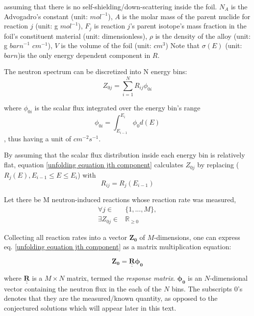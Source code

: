 \documentclass[a4paper, 12pt]{article}
\newcommand{\matr}[1]{\underline{\underline{\textbf{#1}}}}
\newcommand{\ve}[1]{\boldsymbol{#1}}
\begin{document}
assuming that there is no self-shielding/down-scattering inside the foil.
$N_A$ is the Advogadro's constant (unit: ${mol}^{-1}$),
$A$ is the molar mass of the parent nuclide for reaction $j$ (unit: g ${mol}^{-1}$),
$F_j$ is reaction $j$'s parent isotope's mass fraction in the foil's constituent material (unit: dimensionless),
$\rho$ is the density of the alloy (unit: g ${barn}^{-1}$ ${cm}^{-1}$),
$V$ is the volume of the foil (unit: ${cm}^3$) Note that $\sigma(E)$ (unit: $barn$)is the only energy dependent component in $R$. %

The neutron spectrum can be discretized into N energy bins:
\begin{equation} \label{unfolding equation jth component}
    Z_{0j}= \sum_{i=1}^{N} R_{ij} \phi_{0i}
\end{equation}

where $\phi_{0i}$ is the scalar flux integrated over the energy bin's range 
\begin{equation}
    \phi_{0i} = \int_{E_{i-1}}^{E_i} \phi_{0} d(E)
\end{equation}
, thus having a unit of $cm^{-2} s^{-1}$.

By assuming that the scalar flux distribution inside each energy bin is relatively flat, equation \ref{unfolding equation jth component} calculates $Z_{0j}$ by replacing ($R_j (E), E_{i-1}\le E\le E_{i}$) with 
\begin{equation}
    R_{ij}=R_j (E_{i-1})
\end{equation}

Let there be M neutron-induced reactions whose reaction rate was measured,
\begin{equation}
\begin{split}
    \forall j \in & \{ 1, ..., M \},  \\
    \exists Z_{0j} \in & \mathbb R_{\ge 0}
\end{split}
\end{equation}

Collecting all reaction rates into a vector $\ve{Z_0}$ of $M$-dimensions, one can express eq. \ref{unfolding equation jth component} as a matrix multiplication equation:
    
\begin{equation} \label{unfolding general equation}
\ve{Z_0}=\matr{R} \ve{\phi_0}
\end{equation}

where $\matr{R}$ is a $M\times N$ matrix, termed the \emph{response matrix}. $\ve{\phi_0}$ is an $N$-dimensional vector containing the neutron flux in the each of the $N$ bins. The subscripts 0's denotes that they are the measured/known quantity, as opposed to the conjectured solutions which will appear later in this text.
\end{document}
